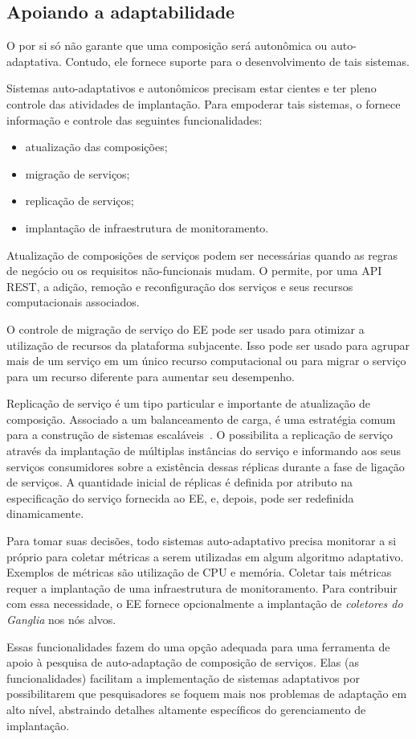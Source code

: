 \subsection{Apoiando a adaptabilidade}

O \ee por si só não garante que uma composição será autonômica ou auto-adaptativa.
Contudo, ele fornece suporte para o desenvolvimento de tais sistemas.

Sistemas auto-adaptativos e autonômicos precisam estar cientes
e ter pleno controle das atividades de implantação.
Para empoderar tais sistemas, o \choreos \ee fornece informação e controle
das seguintes funcionalidades:

\begin{itemize}
\item atualização das composições;
\item migração de serviços;
\item replicação de serviços;
\item implantação de infraestrutura de monitoramento.
\end{itemize}

Atualização de composições de serviços podem ser necessárias quando
as regras de negócio ou os requisitos não-funcionais mudam.
O \ee permite, por uma API REST, a adição, remoção e reconfiguração dos serviços
e seus recursos computacionais associados.

O controle de migração de serviço do EE pode ser usado para otimizar
a utilização de recursos da plataforma subjacente.
Isso pode ser usado para agrupar mais de um serviço em um único
recurso computacional ou para migrar o serviço para um recurso diferente
para aumentar seu desempenho.

Replicação de serviço é um tipo particular e importante de atualização de composição.
Associado a um balanceamento de carga, é uma estratégia comum para
a construção de sistemas escaláveis~\cite{Amazon2012Practices}.
O \ee possibilita a replicação de serviço através da implantação de
múltiplas instâncias do serviço e informando aos seus serviços consumidores
sobre a existência dessas réplicas durante a fase de ligação de serviços.
A quantidade inicial de réplicas é definida por atributo na especificação
do serviço fornecida ao EE, e, depois, pode ser redefinida dinamicamente.

Para tomar suas decisões, todo sistemas auto-adaptativo precisa monitorar
a si próprio para coletar métricas a serem utilizadas em algum algoritmo adaptativo.
Exemplos de métricas são utilização de CPU e memória.
Coletar tais métricas requer a implantação de uma infraestrutura de monitoramento.
Para contribuir com essa necessidade, o EE fornece opcionalmente a implantação
de \emph{coletores do Ganglia} nos nós alvos.

Essas funcionalidades fazem do \ee uma opção adequada para uma ferramenta de apoio 
à pesquisa de auto-adaptação de composição de serviços.
Elas (as funcionalidades) facilitam a implementação de sistemas adaptativos
por possibilitarem que pesquisadores se foquem mais nos problemas de adaptação em
alto nível, abstraindo detalhes altamente específicos do gerenciamento de implantação.

